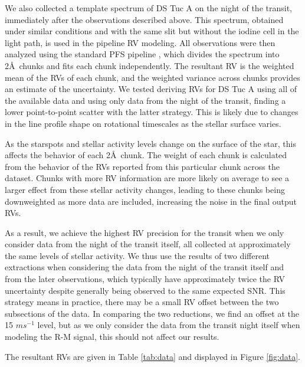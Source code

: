 \documentclass[twocolumn]{aastex63}
\begin{document}
We also collected a template spectrum of DS Tuc A on the night of the transit, immediately after the observations described above.
This spectrum, obtained under similar conditions and with the same slit but without the iodine cell in the light path, is used in the pipeline RV modeling.
All observations were then analyzed using the standard PFS pipeline \citep{Butler96b}, which divides the spectrum into 2\AA\ chunks and fits each chunk independently.
The resultant RV is the weighted mean of the RVs of each chunk, and the weighted variance across chunks provides an estimate of the uncertainty.
We tested deriving RVs for DS Tuc A using all of the available data and using only data from the night of the transit, finding a lower point-to-point scatter with the latter strategy. 
This is likely due to changes in the line profile shape on rotational timescales as the stellar surface varies.


As the starspots and stellar activity levels change on the surface of the star, this affects the behavior of each 2\AA\ chunk. 
The weight of each chunk is calculated from the behavior of the RVs reported from this particular chunk across the dataset. 
Chunks with more RV information are more likely on average to see a larger effect from these stellar activity changes, leading to these chunks being downweighted as more data are included, increasing the noise in the final output RVs.


As a result, we achieve the highest RV precision for the transit when we only consider data from the night of the transit itself, all collected at approximately the same levels of stellar activity. We thus use the results of two different extractions when considering the data from the night of the transit itself and from the later observations, which typically have approximately twice the RV uncertainty despite generally being observed to the same expected SNR.
This strategy means in practice, there may be a small RV offset between the two subsections of the data. In comparing the two reductions, we find an offset at the 15 $m s^{-1}$ level, but as we only consider the data from the transit night itself when modeling the R-M signal, this should not affect our results.

The resultant RVs are given in Table \ref{tab:data} and displayed in Figure \ref{fig:data}.
\end{document}

